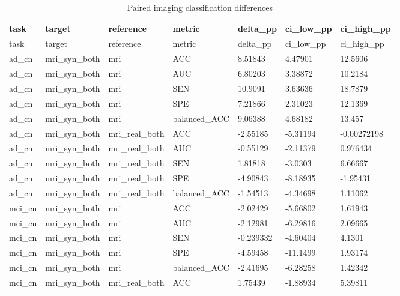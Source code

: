 \begin{landscape}
\begingroup
\footnotesize
\setlength{\tabcolsep}{4pt}
\begin{longtable}{lllllll}
\caption{Paired imaging classification differences}\label{tab:classification_comparisons}\\
\toprule
task & target & reference & metric & delta\_pp & ci\_low\_pp & ci\_high\_pp \\
\midrule
\endfirsthead
\toprule
task & target & reference & metric & delta\_pp & ci\_low\_pp & ci\_high\_pp \\
\midrule
\endhead
\bottomrule
\endfoot
ad\_cn & mri\_syn\_both & mri & ACC & 8.51843 & 4.47901 & 12.5606 \\
ad\_cn & mri\_syn\_both & mri & AUC & 6.80203 & 3.38872 & 10.2184 \\
ad\_cn & mri\_syn\_both & mri & SEN & 10.9091 & 3.63636 & 18.7879 \\
ad\_cn & mri\_syn\_both & mri & SPE & 7.21866 & 2.31023 & 12.1369 \\
ad\_cn & mri\_syn\_both & mri & balanced\_ACC & 9.06388 & 4.68182 & 13.457 \\
ad\_cn & mri\_syn\_both & mri\_real\_both & ACC & -2.55185 & -5.31194 & -0.00272198 \\
ad\_cn & mri\_syn\_both & mri\_real\_both & AUC & -0.55129 & -2.11379 & 0.976434 \\
ad\_cn & mri\_syn\_both & mri\_real\_both & SEN & 1.81818 & -3.0303 & 6.66667 \\
ad\_cn & mri\_syn\_both & mri\_real\_both & SPE & -4.90843 & -8.18935 & -1.95431 \\
ad\_cn & mri\_syn\_both & mri\_real\_both & balanced\_ACC & -1.54513 & -4.34698 & 1.11062 \\
mci\_cn & mri\_syn\_both & mri & ACC & -2.02429 & -5.66802 & 1.61943 \\
mci\_cn & mri\_syn\_both & mri & AUC & -2.12981 & -6.29816 & 2.09665 \\
mci\_cn & mri\_syn\_both & mri & SEN & -0.239332 & -4.60404 & 4.1301 \\
mci\_cn & mri\_syn\_both & mri & SPE & -4.59458 & -11.1499 & 1.93174 \\
mci\_cn & mri\_syn\_both & mri & balanced\_ACC & -2.41695 & -6.28258 & 1.42342 \\
mci\_cn & mri\_syn\_both & mri\_real\_both & ACC & 1.75439 & -1.88934 & 5.39811 \\

\end{longtable}
\end{landscape}
